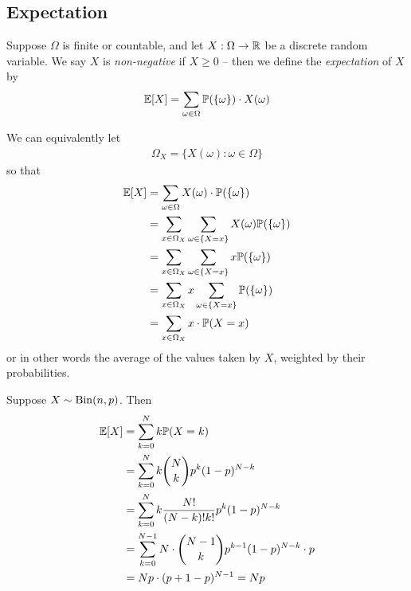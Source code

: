 \documentclass{../template/note}
\begin{document}
    
    \subsection{Expectation}

    \begin{definition}
        Suppose \(\Omega\) is finite or countable, and let \(X: \Omega \to \mathbb R\) be a discrete random variable. We say \(X\) is \emph{non-negative} if \(X \geq 0\) -- then we define the \emph{expectation} of \(X\) by
        \begin{align*}
            \mathbb E[X] = \sum_{\omega \in \Omega} \mathbb P(\{\omega\}) \cdot X(\omega)
        \end{align*}
    \end{definition}
    
    We can equivalently let
    \begin{align*}
        \Omega_X = \{X(\omega): \omega \in \Omega\}
    \end{align*}
    so that
    \begin{align*}
        \mathbb E[X] &= \sum_{\omega \in \Omega}X(\omega) \cdot \mathbb P(\{\omega\}) \\
        &= \sum_{x \in \Omega_X} \sum_{\omega \in \{X = x\}} X(\omega) \mathbb P(\{\omega\}) \\
        &= \sum_{x \in \Omega_X} \sum_{\omega \in \{X = x\}} x \mathbb P(\{\omega\}) \\
        &= \sum_{x \in \Omega_X} x \sum_{\omega \in \{X = x\}} \mathbb P(\{\omega\}) \\
        &= \sum_{x \in \Omega_X} x \cdot  \mathbb P(X = x)
    \end{align*}
    or in other words the average of the values taken by \(X\), weighted by their probabilities.
    
    \begin{example}
        Suppose \(X \sim \operatorname{Bin}(n, p)\). Then
        \begin{align*}
            \mathbb E[X] &= \sum_{k=0}^N k\mathbb P(X = k) \\
            &= \sum_{k=0}^N k \binom N k p^k (1-p)^{N-k} \\
            &= \sum_{k=0}^N k \frac{N!}{(N-k)!k!}p^k(1-p)^{N-k} \\
            &= \sum_{k=0}^{N-1} N \cdot \binom{N-1}{k} p^{k-1} (1-p)^{N-k} \cdot p \\
            &= Np \cdot (p+1-p)^{N-1} = Np
        \end{align*}
    \end{example}
    
\end{document}
